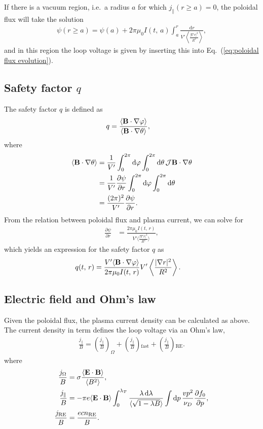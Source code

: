 \documentclass[11pt,a4paper]{article}
\newcommand{\rd}{\ensuremath{\mathrm{d}}}
\newcommand{\sub}[1]{\ensuremath{_{\text{#1}}}}
\renewcommand{\b}[1]{\ensuremath{ {\bf #1 } }}
\begin{document}
If there is a vacuum region, i.e.~a radius $a$ for which $j_\parallel(r\geq a) = 0$, the poloidal flux will take the solution 
\begin{align}
\psi(r\geq a) = \psi(a) + 2\pi\mu_0 I(t,\,a) \int_a^r \frac{\rd r}{V'\left\langle \frac{|\nabla r|^2}{R^2}\right\rangle },
\end{align}
and in this region the loop voltage is given by inserting this  into Eq.~(\ref{eq:poloidal flux evolution}).

\subsection{Safety factor $q$}
The safety factor $q$ is defined as
\begin{align}
q &= \frac{\langle \b{B}\cdot\nabla\varphi\rangle}{\langle \b{B}\cdot\nabla\theta\rangle},
\end{align}
where
\begin{align}
\langle \b{B}\cdot\nabla\theta \rangle &= \frac{1}{V'} \int_0^{2\pi} \rd \varphi \int_0^{2\pi}\rd\theta \,\mathcal{J} \b{B}\cdot\nabla \theta \nonumber \\
&=\frac{1}{V'}\frac{\partial \psi}{\partial r} \int_0^{2\pi} \rd \varphi \int_0^{2\pi}\rd\theta  \nonumber \\
&= \frac{(2\pi)^2}{V'}\frac{\partial \psi}{\partial r}.
\end{align}
From the relation between poloidal flux and plasma current, we can solve for
\begin{align}
\frac{\partial \psi}{\partial r} &= \frac{2\pi \mu_0 I(t,\,r)}{V'\langle\frac{|\nabla r|^2}{R^2}\rangle},
\end{align}
which yields an expression for the safety factor $q$ as
\begin{align}
q(t,\,r) &= \frac{V'\langle \b{B}\cdot\nabla\varphi\rangle}{2\pi \mu_0 I(t,\,r)}V'\left\langle\frac{|\nabla r|^2}{R^2}\right\rangle.
\end{align}

\subsection{Electric field and Ohm's law}
Given the poloidal flux, the plasma current density can be calculated as above. The current density in term defines the loop voltage via an Ohm's law,%
\begin{align}
\frac{j_\parallel}{B} = \left(\frac{j_\parallel}{B}\right)_\Omega + \left(\frac{j_\parallel}{B}\right)\sub{fast} + \left(\frac{j_\parallel}{B}\right)\sub{RE}.
\end{align}
where
\begin{align}
\frac{j_\Omega}{B} &= \sigma \frac{\langle \b{E}\cdot\b{B} \rangle}{\langle B^2\rangle}, \nonumber \\
\frac{j_\parallel}{B} &= -\pi  e\langle \b{E}\cdot\b{B}\rangle \int_0^{\lambda_T}\frac{\lambda\,\rd \lambda}{\langle\sqrt{1-\lambda B}\rangle}\int \rd p \, \frac{vp^2}{\nu_D}\frac{\partial f_0}{\partial p}, \nonumber\\
\frac{j\sub{RE}}{B} &= \frac{ecn\sub{RE}}{B}.
\end{align}
\end{document}
